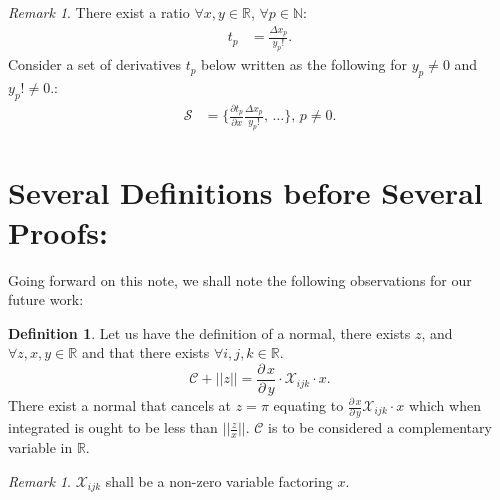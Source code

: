 \documentclass[10pt]{article}
\theoremstyle{plain}
\theoremstyle{definition}
\newtheorem{definition}[theorem]{Definition}
\theoremstyle{remark}
\newtheorem{remark}[theorem]{Remark}
\begin{document}
\begin{remark}
There exist a ratio $\forall x, y \in \mathbb{R}$, $\forall p \in \mathbb{N}$:
\begin{align*}
	t_p &= \frac{\Delta x_p}{y_p!}.
\end{align*}
Consider a set of derivatives $t_p$ below written as the following for $y_p \neq 0$ and $y_p! \neq 0$.:
\begin{align*}
	\mathcal{S} &= \{ \frac{\partial t_p}{\partial x} \frac{\Delta x_p}{y_p!}, \, \dots \}, \, p \neq 0.
\end{align*}
\end{remark}

\section{Several Definitions before Several Proofs:}

Going forward on this note, we shall note the following observations for our future work:

\begin{definition}
	Let us have the definition of a normal, there exists $z$, and $\forall z, x, y \in \mathbb{R}$ and that there exists $\forall i, j, k \in \mathbb{R}$.
	\begin{equation}
		\mathcal{C} + ||z|| = \frac{\partial \, x}{\partial \, y} \cdot \mathcal{X}_{ijk} \cdot x.
	\end{equation}
	There exist a normal that cancels at $z=\pi$ equating to $\frac{\partial \, x}{\partial \, y} \mathcal{X}_{ijk} \cdot x$ which when integrated is ought to be less than $||\frac{z}{x}||$. $\mathcal{C}$ is to be considered a complementary variable in $\mathbb{R}$.
\end{definition}

\begin{remark}
	$\mathcal{X}_{ijk}$ shall be a non-zero variable factoring $x$.
\end{remark}
\end{document}
